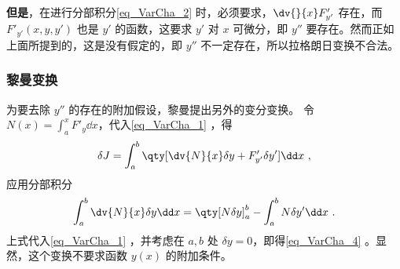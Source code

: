 \textbf{但是}，在进行分部积分\autoref{eq_VarCha_2} 时，必须要求，$\dv{}{x}F'_{y'}$ 存在，而 $F'_{y'}(x,y,y')$ 也是 $y'$ 的函数，这要求 $y'$ 对 $x$ 可微分，即 $y''$ 要存在。然而正如上面所提到的，这是没有假定的，即 $y''$ 不一定存在，所以拉格朗日变换不合法。
\subsubsection{黎曼变换}
为要去除 $y''$ 的存在的附加假设，黎曼提出另外的变分变换。
令 $N(x)=\int_a^xF'_y\dd x$，代入\autoref{eq_VarCha_1} ，得
\begin{equation}
\delta J=\int_a^b\qty[\dv{N}{x}\delta y+F'_{y'}\delta y']\dd x~,
\end{equation}
应用分部积分
\begin{equation}
\int_a^b\dv{N}{x}\delta y\dd x=\qty[N\delta y]_a^b-\int_a^bN\delta y'\dd x~.
\end{equation}
上式代入\autoref{eq_VarCha_1} ，并考虑在 $a,b$ 处 $\delta y=0$，即得\autoref{eq_VarCha_4} 。显然，这个变换不要求函数 $y(x)$ 的附加条件。
